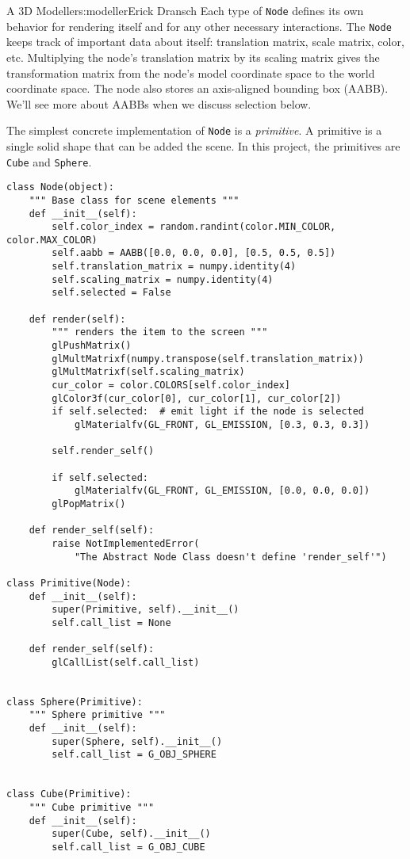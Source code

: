 \begin{aosachapter}{A 3D Modeller}{s:modeller}{Erick Dransch}
Each type of \texttt{Node} defines its own behavior for rendering itself
and for any other necessary interactions. The \texttt{Node} keeps track
of important data about itself: translation matrix, scale matrix, color,
etc. Multiplying the node's translation matrix by its scaling matrix
gives the transformation matrix from the node's model coordinate space
to the world coordinate space. The node also stores an axis-aligned
bounding box (AABB). We'll see more about AABBs when we discuss
selection below.

The simplest concrete implementation of \texttt{Node} is a
\emph{primitive}. A primitive is a single solid shape that can be added
the scene. In this project, the primitives are \texttt{Cube} and
\texttt{Sphere}.

\begin{verbatim}
class Node(object):
    """ Base class for scene elements """
    def __init__(self):
        self.color_index = random.randint(color.MIN_COLOR, color.MAX_COLOR)
        self.aabb = AABB([0.0, 0.0, 0.0], [0.5, 0.5, 0.5])
        self.translation_matrix = numpy.identity(4)
        self.scaling_matrix = numpy.identity(4)
        self.selected = False

    def render(self):
        """ renders the item to the screen """
        glPushMatrix()
        glMultMatrixf(numpy.transpose(self.translation_matrix))
        glMultMatrixf(self.scaling_matrix)
        cur_color = color.COLORS[self.color_index]
        glColor3f(cur_color[0], cur_color[1], cur_color[2])
        if self.selected:  # emit light if the node is selected
            glMaterialfv(GL_FRONT, GL_EMISSION, [0.3, 0.3, 0.3])
        
        self.render_self()

        if self.selected:
            glMaterialfv(GL_FRONT, GL_EMISSION, [0.0, 0.0, 0.0])
        glPopMatrix()

    def render_self(self):
        raise NotImplementedError(
            "The Abstract Node Class doesn't define 'render_self'")

class Primitive(Node):
    def __init__(self):
        super(Primitive, self).__init__()
        self.call_list = None

    def render_self(self):
        glCallList(self.call_list)


class Sphere(Primitive):
    """ Sphere primitive """
    def __init__(self):
        super(Sphere, self).__init__()
        self.call_list = G_OBJ_SPHERE


class Cube(Primitive):
    """ Cube primitive """
    def __init__(self):
        super(Cube, self).__init__()
        self.call_list = G_OBJ_CUBE
\end{verbatim}


\end{aosachapter}
